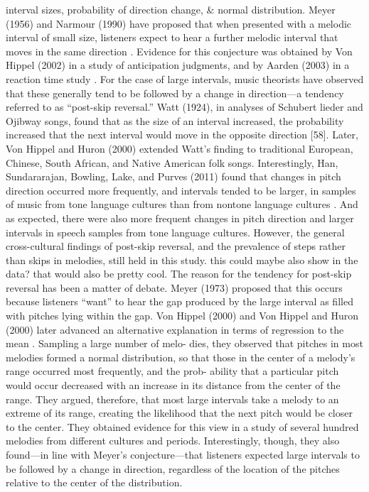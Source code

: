 interval sizes, probability of direction change, & normal distribution. Meyer (1956) and Narmour (1990) have proposed that when presented with a melodic interval of small size, listeners expect to hear a further melodic interval that moves in the same direction \cite{meyer2008emotion} \cite{narmour1990analysis}. Evidence for this conjecture was obtained by Von Hippel (2002) in a study of anticipation judgments, and by Aarden (2003) in a reaction time study \cite{von2002melodic} \cite{aarden2003dynamic}. For the case of large intervals, music theorists have observed that these generally tend to be followed by a change in direction—a tendency referred to as “post-skip reversal.” Watt (1924), in analyses of Schubert lieder and Ojibway songs, found that as the size of an interval increased, the probability increased that the next interval would move in the opposite direction [58]. Later, Von Hippel and Huron (2000) extended Watt’s finding to traditional European, Chinese, South African, and Native American folk songs. Interestingly, Han, Sundararajan, Bowling, Lake, and Purves (2011) found that changes in pitch direction occurred more frequently, and intervals tended to be larger, in samples of music from tone language cultures than from nontone language cultures \cite{han2011co}. And as expected, there were also more frequent changes in pitch direction and larger intervals in speech samples from tone language cultures. However, the general cross-cultural findings of post-skip reversal, and the prevalence of steps rather than skips in melodies, still held in this study. this could maybe also show in the data? that would also be pretty cool.  The reason for the tendency for post-skip reversal has been a matter of debate. Meyer (1973) proposed that this occurs because listeners “want” to hear the gap produced by the large interval as filled with pitches lying within the gap. Von Hippel (2000) and Von Hippel and Huron (2000) later advanced an alternative explanation in terms of regression to the mean \cite{meyer1973explaining}. Sampling a large number of melo- dies, they observed that pitches in most melodies formed a normal distribution, so that those in the center of a melody’s range occurred most frequently, and the prob- ability that a particular pitch would occur decreased with an increase in its distance from the center of the range. They argued, therefore, that most large intervals take a melody to an extreme of its range, creating the likelihood that the next pitch would be closer to the center. They obtained evidence for this view in a study of several hundred melodies from different cultures and periods. Interestingly, though, they also found—in line with Meyer’s conjecture—that listeners expected large intervals to be followed by a change in direction, regardless of the location of the pitches relative to the center of the distribution.
